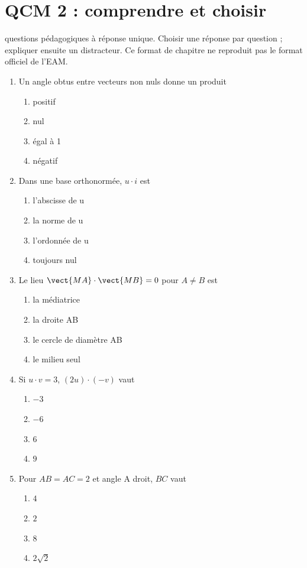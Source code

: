 \endgroup
\begingroup\small
{}\section*{QCM 2 : comprendre et choisir}\label{C03-Q2}
 questions pédagogiques à réponse unique. Choisir une réponse par question ; expliquer ensuite un distracteur. Ce format de chapitre ne reproduit pas le format officiel de l’EAM.
\begin{enumerate}
\item Un angle obtus entre vecteurs non nuls donne un produit
\begin{enumerate}[label=\Alph*.,itemsep=2pt]
\item positif
\item nul
\item égal à 1
\item négatif
\end{enumerate}
\item Dans une base orthonormée, $u\cdot i$ est
\begin{enumerate}[label=\Alph*.,itemsep=2pt]
\item l’abscisse de u
\item la norme de u
\item l’ordonnée de u
\item toujours nul
\end{enumerate}
\item Le lieu $\vect{MA}\cdot\vect{MB}=0$ pour $A\ne B$ est
\begin{enumerate}[label=\Alph*.,itemsep=2pt]
\item la médiatrice
\item la droite AB
\item le cercle de diamètre AB
\item le milieu seul
\end{enumerate}
\item Si $u\cdot v=3$, $(2u)\cdot(-v)$ vaut
\begin{enumerate}[label=\Alph*.,itemsep=2pt]
\item $-3$
\item $-6$
\item $6$
\item $9$
\end{enumerate}
\item Pour $AB=AC=2$ et angle A droit, $BC$ vaut
\begin{enumerate}[label=\Alph*.,itemsep=2pt]
\item $4$
\item $2$
\item $8$
\item $2\sqrt2$
\end{enumerate}
\end{enumerate}
